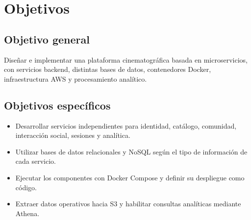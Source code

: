 ﻿\chapter{Objetivos}
\section{Objetivo general}
Diseñar e implementar una plataforma cinematográfica basada en microservicios, con servicios backend, distintas bases de datos, contenedores Docker, infraestructura AWS y procesamiento analítico.
\section{Objetivos específicos}
\begin{itemize}
\item Desarrollar servicios independientes para identidad, catálogo, comunidad, interacción social, sesiones y analítica.
\item Utilizar bases de datos relacionales y NoSQL según el tipo de información de cada servicio.
\item Ejecutar los componentes con Docker Compose y definir su despliegue como código.
\item Extraer datos operativos hacia S3 y habilitar consultas analíticas mediante Athena.
\end{itemize}
